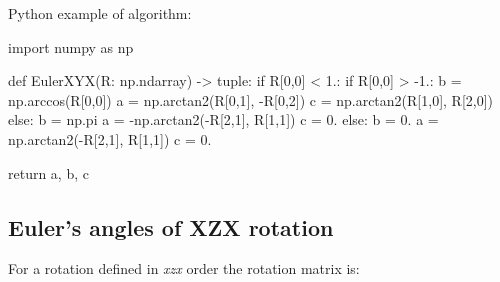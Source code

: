     Python example of algorithm:

\begin{python}
import numpy as np

def EulerXYX(R: np.ndarray) -> tuple:
    if R[0,0] < 1.:
        if R[0,0] > -1.:
            b = np.arccos(R[0,0])
            a = np.arctan2(R[0,1], -R[0,2])
            c = np.arctan2(R[1,0], R[2,0])
        else:
            b = np.pi
            a = -np.arctan2(-R[2,1], R[1,1])
            c = 0.
    else:
        b = 0.
        a = np.arctan2(-R[2,1], R[1,1])
        c = 0.

    return a, b, c
\end{python}

\subsection{Euler's angles of \textbf{XZX} rotation}

    For a rotation defined in \textit{xzx} order the rotation matrix is:

